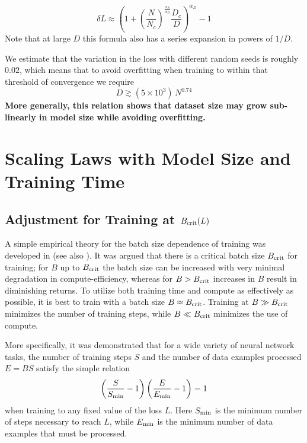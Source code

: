 \documentclass[english]{article}
\newcommand{\be}{\begin{equation}}
\newcommand{\ee}{\end{equation}}
\begin{document}
\be
\label{eq:OverfittingPrediction}
\delta L \approx  \left( 1 +  \left(\frac{N}{N_c} \right)^{\frac{\alpha_N}{\alpha_D}} \frac{D_c}{D} \right)^{\alpha_D} - 1 
\ee
Note that at large $D$ this formula also has a series expansion in powers of $1/D$.

We estimate that the variation in the loss with different random seeds is roughly $0.02$, which means that to avoid overfitting when training to within that threshold of convergence we require 
\be
D \gtrsim (5 \times 10^3) \, N^{0.74}
\ee
\textbf{More generally, this relation shows that dataset size may grow sub-linearly in model size while avoiding overfitting.}

\section{Scaling Laws with Model Size and Training Time}
\label{sec:ScalingSizeandSteps}

\subsection{Adjustment for Training at $B_{\rm crit}(L)$}
\label{sec:OptimalBatchSize}

A simple empirical theory for the batch size dependence of training was developed in \cite{1812.06162} (see also \cite{1811.03600, DBLP:journals/corr/abs-1907-04164}).  It was argued that there is a critical batch size $B_{\rm crit}$ for training; for $B$ up to $B_{\rm crit}$  the batch size can be increased with very minimal degradation in compute-efficiency, whereas for $B > B_{\rm crit}$ increases in $B$ result in diminishing returns.  To utilize both training time and compute as effectively as possible, it is best to train with a batch size $B \approx B_{\rm crit}$.  Training at $B \gg B_{\rm crit}$  minimizes the number of training steps, while $B \ll B_{\rm crit}$ minimizes the use of compute.

More specifically, it was demonstrated that for a wide variety of neural network tasks, the number of training steps $S$ and the number of data examples processed $E = B S$ satisfy the simple relation
\be
\label{eq:TimeComputeTradeoff}
\left( \frac{S}{S_{\rm min}} -1 \right) \left( \frac{E}{E_{\rm min}} - 1 \right) = 1
\ee
when training to any fixed value of the loss $L$.  Here $S_{\rm min}$ is the minimum number of steps necessary to reach $L$, while $E_{\rm min}$ is the minimum number of data examples that must be processed. 
\end{document}
